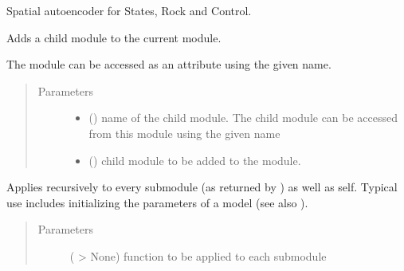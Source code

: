 \documentclass[letterpaper,10pt,english]{sphinxmanual}
\begin{document}
\begin{fulllineitems}
\label{\detokenize{api/autoencoding:geology.metamodelling.SpatialAutoencoder}}
Spatial autoencoder for States, Rock and Control.

\begin{fulllineitems}
\label{\detokenize{api/autoencoding:geology.metamodelling.SpatialAutoencoder.add_module}}
Adds a child module to the current module.

The module can be accessed as an attribute using the given name.
\begin{quote}\begin{description}
\item[{Parameters}] \leavevmode\begin{itemize}
\item {} 
 () \textendash{} name of the child module. The child module can be
accessed from this module using the given name

\item {} 
 () \textendash{} child module to be added to the module.

\end{itemize}

\end{description}\end{quote}

\end{fulllineitems}


\begin{fulllineitems}
\label{\detokenize{api/autoencoding:geology.metamodelling.SpatialAutoencoder.apply}}
Applies  recursively to every submodule (as returned by )
as well as self. Typical use includes initializing the parameters of a model
(see also ).
\begin{quote}\begin{description}
\item[{Parameters}] \leavevmode
{} ( \sphinxhyphen{}\textgreater{} None) \textendash{} function to be applied to each submodule


\end{description}
\end{quote}
\end{fulllineitems}
\end{fulllineitems}
\end{document}
